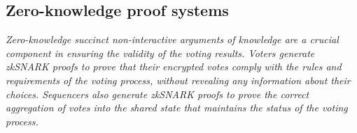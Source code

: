\subsection{Zero-knowledge proof systems}
\label{sec:cryptographic-primitives:zkp}

\textit{Zero-knowledge succinct non-interactive arguments of knowledge are a crucial component in ensuring the validity of the voting results. Voters generate zkSNARK proofs to prove that their encrypted votes comply with the rules and requirements of the voting process, without revealing any information about their choices. Sequencers also generate zkSNARK proofs to prove the correct aggregation of votes into the shared state that maintains the status of the voting process.}